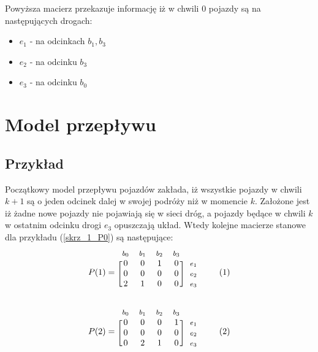 \documentclass[12pt]{book}
\theoremstyle{plain}
\newcommand\addtag{\refstepcounter{equation}
\renewcommand{\labelenumii}{\theenumii}
\renewcommand{\theenumii}{\theenumi.\arabic{enumii}.}
\tag{\theequation}}
\begin{document}
Powyższa macierz przekazuje informację iż w chwili $0$ pojazdy są na następujących drogach:
\begin{itemize}
\item $e_1$ - na odcinkach $b_1,b_3$ 
\item $e_2$ - na odcinku $b_3$ 
\item $e_3$ - na odcinku $b_0$ 
\end{itemize}
\section{Model przepływu}
\subsection{Przykład}
Początkowy model przepływu pojazdów zakłada, iż wszystkie pojazdy w chwili $k+1$ są o jeden odcinek dalej w swojej podróży niż w momencie $k$. Założone jest iż żadne nowe pojazdy nie pojawiają się w sieci dróg, a pojazdy będące w chwili $k$ w ostatnim odcinku drogi $e_3$ opuszczają układ. Wtedy kolejne macierze stanowe dla przykładu (\ref{skrz_1_P0}) są następujące:
\begin{equation*}
  P(1)=
  \begin{blockarray}{*{4}{c} l}
    \begin{block}{*{4}{>{$\footnotesize}c<{$}} l}
      $b_0$ & $b_1$  & $b_2$ & $b_3$ \\
    \end{block}
    \begin{block}{[*{4}{c}]>{$\footnotesize}l<{$}}
       0 & 0 & 1 & 0 & $e_1$ \\
       0 & 0 & 0 & 0 & $e_2$ \\
       2 & 1 & 0 & 0 & $e_3$ \\
    \end{block}
  \end{blockarray} \addtag
\end{equation*}

\begin{equation*}
  P(2)=
  \begin{blockarray}{*{4}{c} l}
    \begin{block}{*{4}{>{$\footnotesize}c<{$}} l}
      $b_0$ & $b_1$ & $b_2$ & $b_3$  \\
    \end{block}
    \begin{block}{[*{4}{c}]>{$\footnotesize}l<{$}}
       0 & 0 & 0 & 1 & $e_1$ \\
       0 & 0 & 0 & 0 & $e_2$ \\
       0 & 2 & 1 & 0 & $e_3$ \\
    \end{block}
  \end{blockarray} \addtag
\end{equation*}
\end{document}
